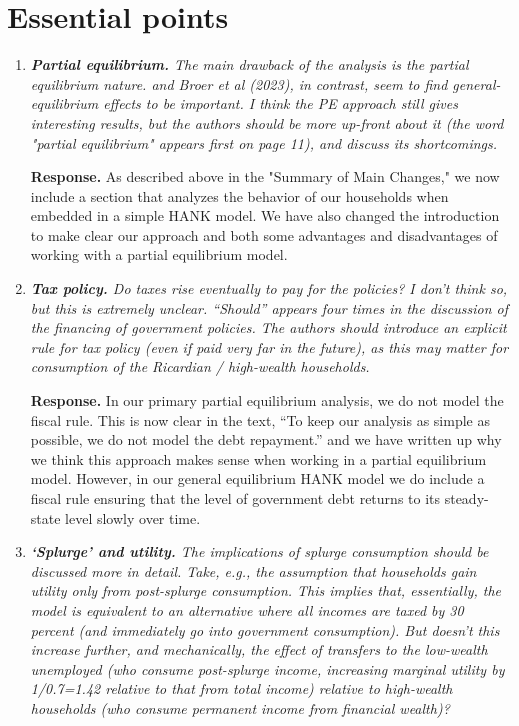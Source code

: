 \documentclass[12pt,letterpaper,english]{article}
\begin{document}
\section{Essential points}
\begin{enumerate}
	\item \textit{\textbf{Partial equilibrium.} The main drawback of the analysis is the partial equilibrium nature. \citet{kekre2022unemp} and Broer et al (2023), in contrast, seem to find general-equilibrium effects to be important. I think the PE approach still gives interesting results, but the authors should be more up-front about it (the word "partial equilibrium" appears first on page 11), and discuss its shortcomings.}
	
	\noindent \textbf{Response.} As described above in the "Summary of Main Changes," we now include a section that analyzes the behavior of our households when embedded in a simple HANK model. We have also changed the introduction to make clear our approach and both some advantages and disadvantages of working with a partial equilibrium model.
	
	\item \textit{\textbf{Tax policy.} Do taxes rise eventually to pay for the policies? I don't think so, but this is extremely unclear. ``Should'' appears four times in the discussion of the financing of government policies. The authors should introduce an explicit rule for tax policy (even if paid very far in the future), as this may matter for consumption of the Ricardian / high-wealth households.}
	
	\noindent \textbf{Response.} In our primary partial equilibrium analysis, we do not model the fiscal rule. This is now clear in the text, ``To keep our analysis as simple as possible, we do not model the debt repayment.'' and we have written up why we think this approach makes sense when working in a partial equilibrium model. However, in our general equilibrium HANK model we do include a fiscal rule ensuring that the level of government debt returns to its steady-state level slowly over time.
	
	\item \textit{\textbf{`Splurge' and utility.} The implications of splurge consumption should be discussed more in detail. Take, e.g., the assumption that households gain utility only from post-splurge consumption. This implies that, essentially, the model is equivalent to an alternative where all incomes are taxed by 30 percent (and immediately go into government consumption). But doesn't this increase further, and mechanically, the effect of transfers to the low-wealth unemployed (who consume post-splurge income, increasing marginal utility by 1/0.7=1.42 relative to that from total income) relative to high-wealth households (who consume permanent income from financial wealth)?}
		

\end{enumerate}
\end{document}
